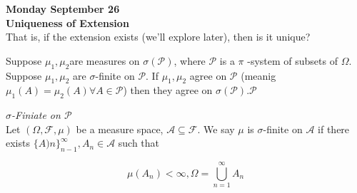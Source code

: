 \documentclass[11pt,fleqn]{book} %
\begin{document}
\textbf{Monday September 26}\\

\textbf{Uniqueness of Extension}\\

That is, if the extension exists (we'll explore later), then is it unique?\\


\begin{theorem}
	Suppose $\mu_1, \mu_2$are measures on $\sigma(\mathcal{P})$,  where $\mathcal{P}$ is a $\pi$
-system of subsets of $\Omega$. Suppose $\mu_1, \mu_2$ are $\sigma$-finite on $\mathcal{P}$. If $\mu_1, \mu_2$ agree on $\mathcal{P}$ (meanig $\mu_1(A) = \mu_2 (A) \forall A \in  \mathcal{P}$) then they agree on $\sigma(\mathcal{P}).\mathcal{P}$ 
\end{theorem}

\textit{$\sigma$-Finiate on $\mathcal{P}$}\\

Let $(\Omega, \mathcal{F}, \mu)$ be a measure space, $\mathcal{A} \subseteq \mathcal{F}$. We say $\mu$ is $\sigma$-finite on $\mathcal{A}$ if there exists $\{A)n \}^\infty_{n-1}, A_n \in \mathcal{A}$ such that 

	$$\mu(A_n) < \infty, \Omega = \bigcup^\infty_{n=1} A_n $$
\end{document}
